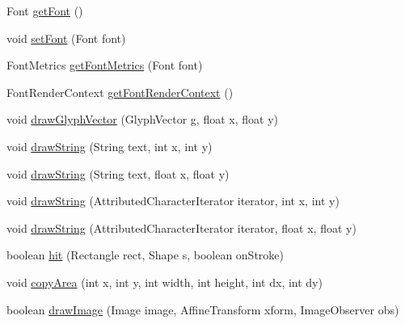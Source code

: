 \begin{DoxyCompactItemize}
\item 
Font \mbox{\hyperlink{classorg_1_1jfree_1_1experimental_1_1swt_1_1_s_w_t_graphics2_d_a35b02d3641ca7fa7de2a05062c275248}{get\+Font}} ()
\item 
void \mbox{\hyperlink{classorg_1_1jfree_1_1experimental_1_1swt_1_1_s_w_t_graphics2_d_a3e7c3e125e139c6c836348d6eeaaeed8}{set\+Font}} (Font font)
\item 
Font\+Metrics \mbox{\hyperlink{classorg_1_1jfree_1_1experimental_1_1swt_1_1_s_w_t_graphics2_d_ab73581967075f5e9876fc90fd4445d02}{get\+Font\+Metrics}} (Font font)
\item 
Font\+Render\+Context \mbox{\hyperlink{classorg_1_1jfree_1_1experimental_1_1swt_1_1_s_w_t_graphics2_d_a80309e8d38feceedd6c7f95980ce5b42}{get\+Font\+Render\+Context}} ()
\item 
void \mbox{\hyperlink{classorg_1_1jfree_1_1experimental_1_1swt_1_1_s_w_t_graphics2_d_ae33137bd8374568e69c3d0bebb684fd6}{draw\+Glyph\+Vector}} (Glyph\+Vector g, float x, float y)
\item 
void \mbox{\hyperlink{classorg_1_1jfree_1_1experimental_1_1swt_1_1_s_w_t_graphics2_d_a6e8e419e7cba40ea1b3a9cb5da2fa91c}{draw\+String}} (String text, int x, int y)
\item 
void \mbox{\hyperlink{classorg_1_1jfree_1_1experimental_1_1swt_1_1_s_w_t_graphics2_d_a91285179103cfc09b32f29faefddafad}{draw\+String}} (String text, float x, float y)
\item 
void \mbox{\hyperlink{classorg_1_1jfree_1_1experimental_1_1swt_1_1_s_w_t_graphics2_d_af465e854913c913bdbadf04cc0461654}{draw\+String}} (Attributed\+Character\+Iterator iterator, int x, int y)
\item 
void \mbox{\hyperlink{classorg_1_1jfree_1_1experimental_1_1swt_1_1_s_w_t_graphics2_d_ae9254d2a461f2a67d9941c060fa723d0}{draw\+String}} (Attributed\+Character\+Iterator iterator, float x, float y)
\item 
boolean \mbox{\hyperlink{classorg_1_1jfree_1_1experimental_1_1swt_1_1_s_w_t_graphics2_d_a368938000d74db081784e61a5895b1be}{hit}} (Rectangle rect, Shape s, boolean on\+Stroke)
\item 
void \mbox{\hyperlink{classorg_1_1jfree_1_1experimental_1_1swt_1_1_s_w_t_graphics2_d_ae0e1b32cc9078240a7d6138b9b4797c6}{copy\+Area}} (int x, int y, int width, int height, int dx, int dy)
\item 
boolean \mbox{\hyperlink{classorg_1_1jfree_1_1experimental_1_1swt_1_1_s_w_t_graphics2_d_adc495a55375217b157050daa025ba03b}{draw\+Image}} (Image image, Affine\+Transform xform, Image\+Observer obs)

\end{DoxyCompactItemize}
